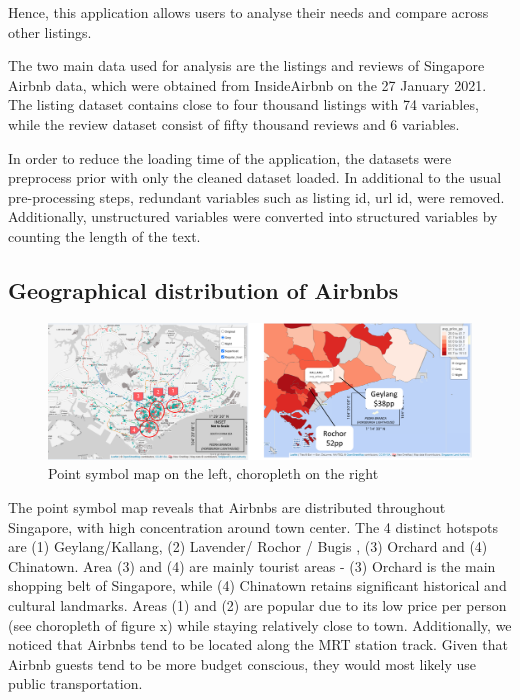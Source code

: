 \documentclass{acm_proc_article-sp}
\begin{document}
Hence, this application allows users to analyse their needs and compare
across other listings.

The two main data used for analysis are the listings and reviews of
Singapore Airbnb data, which were obtained from InsideAirbnb on the 27
January 2021. The listing dataset contains close to four thousand
listings with 74 variables, while the review dataset consist of fifty
thousand reviews and 6 variables.

In order to reduce the loading time of the application, the datasets
were preprocess prior with only the cleaned dataset loaded. In
additional to the usual pre-processing steps, redundant variables such
as listing id, url id, were removed. Additionally, unstructured
variables were converted into structured variables by counting the
length of the text.

\hypertarget{geographical-distribution-of-airbnbs}{%
\subsection{Geographical distribution of
Airbnbs}\label{geographical-distribution-of-airbnbs}}

\begin{figure}[H]

{\centering \includegraphics[width=1\linewidth]{images/usecase_explore} 

}

\caption{Point symbol map on the left, choropleth on the right}\label{fig:unnamed-chunk-17}
\end{figure}

The point symbol map reveals that Airbnbs are distributed throughout
Singapore, with high concentration around town center. The 4 distinct
hotspots are (1) Geylang/Kallang, (2) Lavender/ Rochor / Bugis , (3)
Orchard and (4) Chinatown. Area (3) and (4) are mainly tourist areas -
(3) Orchard is the main shopping belt of Singapore, while (4) Chinatown
retains significant historical and cultural landmarks. Areas (1) and (2)
are popular due to its low price per person (see choropleth of figure x)
while staying relatively close to town. Additionally, we noticed that
Airbnbs tend to be located along the MRT station track. Given that
Airbnb guests tend to be more budget conscious, they would most likely
use public transportation.
\end{document}
